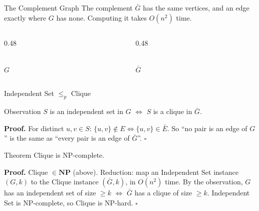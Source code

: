 \documentclass[10pt,aspectratio=169]{beamer}
\newcommand{\pentagon}[5]{%
  \node[#1] (v1) at (90:1.6)  {1};
  \node[#2] (v2) at (18:1.6)  {2};
  \node[#3] (v3) at (-54:1.6) {3};
  \node[#4] (v4) at (-126:1.6) {4};
  \node[#5] (v5) at (162:1.6) {5};
}
\begin{document}
\begin{frame}{The Complement Graph}
  The \alert{complement} $\bar{G}$ has the same vertices, and an edge exactly
  where $G$ has \alert{none}. Computing it takes $O(n^2)$ time.

  \begin{columns}[c]
    \begin{column}{0.48\textwidth}
      \begin{center}
      \\[2pt]
      $G$
      \end{center}
    \end{column}
    \begin{column}{0.48\textwidth}
      \begin{center}
      \\[2pt]
      $\bar{G}$
      \end{center}
    \end{column}
  \end{columns}

  \medskip
\end{frame}

\begin{frame}{Independent Set $\le_p$ Clique}
  \begin{block}{Observation}
    $S$ is an independent set in $G$ $\iff$ $S$ is a clique in $\bar{G}$.
  \end{block}

  \textbf{Proof.} For distinct $u, v \in S$:
  $\{u, v\} \notin E \iff \{u, v\} \in \bar{E}$. So ``no pair is an edge of
  $G$'' is the same as ``every pair is an edge of $\bar{G}$''.
  \hfill $\square$

  \pause
  \begin{block}{Theorem}
    Clique is NP-complete.
  \end{block}

  \textbf{Proof.} Clique $\in \mathbf{NP}$ (above). Reduction: map an
  Independent Set instance $(G, k)$ to the Clique instance $(\bar{G}, k)$,
  in $O(n^2)$ time. By the observation, $G$ has an independent set of size
  $\ge k$ $\iff$ $\bar{G}$ has a clique of size $\ge k$. Independent Set is
  NP-complete, so Clique is NP-hard. \hfill $\square$
\end{frame}
\end{document}

